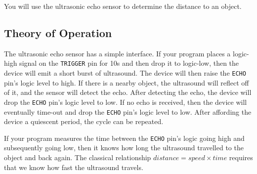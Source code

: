 You will use the ultrasonic echo sensor to determine the distance to an object.

\subsection{Theory of Operation}

The ultrasonic echo sensor has a simple interface.
If your program places a logic-high signal on the \lstinline{TRIGGER} pin for 10\textmu s and then drop it to logic-low, then the device will emit a short burst of ultrasound.
The device will then raise the \lstinline{ECHO} pin's logic level to high.
If there is a nearby object, the ultrasound will reflect off of it, and the sensor will detect the echo.
After detecting the echo, the device will drop the \lstinline{ECHO} pin's logic level to low.
If no echo is received, then the device will eventually time-out and drop the \lstinline{ECHO} pin's logic level to low.
After affording the device a quiescent period, the cycle can be repeated.


If your program measures the time between the \lstinline{ECHO} pin's logic going high and subsequently going low, then it knows how long the ultrasound travelled to the object and back again.
The classical relationship $distance = speed \times time$ requires that we know how fast the ultrasound travels.


